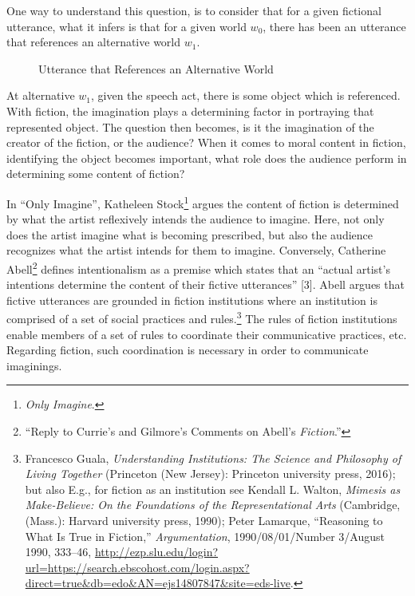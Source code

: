 \documentclass[phdthesis,12pt,final]{wuthesis}
\theoremstyle{definition}
\theoremstyle{definition}
\theoremstyle{definition}
\theoremstyle{definition}
\theoremstyle{remark}
\begin{document}
One way to understand this question, is to consider that for a given fictional utterance, what it infers is that for a given world \(w_0\), there has been an utterance that references an alternative world \(w_1\).

\begin{figure}
\centering
\caption{Utterance that References an Alternative World}
\label{fig:utterance}
\end{figure}

At alternative \(w_1\), given the speech act, there is some object which is referenced. With fiction, the imagination plays a determining factor in portraying that represented object. The question then becomes, is it the imagination of the creator of the fiction, or the audience? When it comes to moral content in fiction, identifying the object becomes important, what role does the audience perform in determining some content of fiction?

In ``Only Imagine'', Katheleen Stock\footnote{\emph{Only Imagine}.} argues the content of fiction is determined by what the artist reflexively intends the audience to imagine. Here, not only does the artist imagine what is becoming prescribed, but also the audience recognizes what the artist intends for them to imagine. Conversely, Catherine Abell\footnote{{``Reply to {Currie}'s and {Gilmore}'s Comments on {Abell}'s {\emph{Fiction}}.''}} defines intentionalism as a premise which states that an ``actual artist's intentions determine the content of their fictive utterances'' {[}3{]}. Abell argues that fictive utterances are grounded in fiction institutions where an institution is comprised of a set of social practices and rules.\footnote{Francesco Guala, \emph{Understanding Institutions: The Science and Philosophy of Living Together} (Princeton (New Jersey): Princeton university press, 2016); but also E.g., for fiction as an institution see Kendall L. Walton, \emph{Mimesis as {Make-Believe}: {On} the {Foundations} of the {Representational Arts}} (Cambridge, (Mass.): Harvard university press, 1990); Peter Lamarque, {``Reasoning to {What} Is {True} in {Fiction},''} \emph{Argumentation}, 1990/08/01/Number 3/August 1990, 333--46, \url{http://ezp.slu.edu/login?url=https://search.ebscohost.com/login.aspx?direct=true&db=edo&AN=ejs14807847&site=eds-live}.} The rules of fiction institutions enable members of a set of rules to coordinate their communicative practices, etc. Regarding fiction, such coordination is necessary in order to communicate imaginings.
\end{document}
